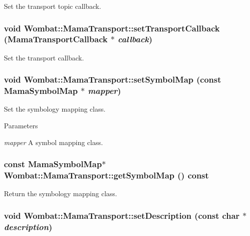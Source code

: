 Set the transport topic callback. \hypertarget{classWombat_1_1MamaTransport_a39e8c1cff1ee0693b457f0dbdb76b52a}{
\subsubsection[{setTransportCallback}]{\setlength{\rightskip}{0pt plus 5cm}void Wombat::MamaTransport::setTransportCallback ({\bf MamaTransportCallback} $\ast$ {\em callback})}}
\label{classWombat_1_1MamaTransport_a39e8c1cff1ee0693b457f0dbdb76b52a}


Set the transport callback. \hypertarget{classWombat_1_1MamaTransport_ac81d6c94ae90b140acbe5f4d2b69b156}{
\subsubsection[{setSymbolMap}]{\setlength{\rightskip}{0pt plus 5cm}void Wombat::MamaTransport::setSymbolMap (const {\bf MamaSymbolMap} $\ast$ {\em mapper})}}
\label{classWombat_1_1MamaTransport_ac81d6c94ae90b140acbe5f4d2b69b156}


Set the symbology mapping class. 
\begin{DoxyParams}{Parameters}
\item[{\em mapper}]A symbol mapping class. \end{DoxyParams}
\hypertarget{classWombat_1_1MamaTransport_a579ad7e9ab5e00e62cf634cbf9256055}{
\subsubsection[{getSymbolMap}]{\setlength{\rightskip}{0pt plus 5cm}const {\bf MamaSymbolMap}$\ast$ Wombat::MamaTransport::getSymbolMap () const}}
\label{classWombat_1_1MamaTransport_a579ad7e9ab5e00e62cf634cbf9256055}


Return the symbology mapping class. \hypertarget{classWombat_1_1MamaTransport_af6e11ba1a55d2a8716888bdfe49bc2b6}{
\subsubsection[{setDescription}]{\setlength{\rightskip}{0pt plus 5cm}void Wombat::MamaTransport::setDescription (const char $\ast$ {\em description})}}
\label{classWombat_1_1MamaTransport_af6e11ba1a55d2a8716888bdfe49bc2b6}


